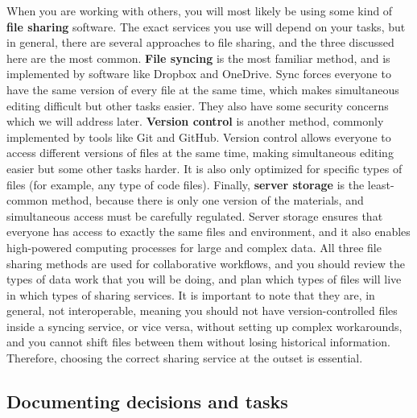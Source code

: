 When you are working with others, you will most likely be using
some kind of \textbf{file sharing} software.
The exact services you use will depend on your tasks,
but in general, there are several approaches to file sharing,
and the three discussed here are the most common.
\textbf{File syncing} is the most familiar method,
and is implemented by software like Dropbox and OneDrive.
Sync forces everyone to have the same version of every file at the same time,
which makes simultaneous editing difficult but other tasks easier.
They also have some security concerns which we will address later.
\textbf{Version control} is another method,
commonly implemented by tools like Git and GitHub.
Version control allows everyone to access different versions of files at the same time,
making simultaneous editing easier but some other tasks harder.
It is also only optimized for specific types of files 
(for example, any type of code files).
Finally, \textbf{server storage} is the least-common method,
because there is only one version of the materials,
and simultaneous access must be carefully regulated.
Server storage ensures that everyone has access
to exactly the same files and environment, and it also enables
high-powered computing processes for large and complex data.
All three file sharing methods are used for collaborative workflows,
and you should review the types of data work
that you will be doing, and plan which types of files
will live in which types of sharing services.
It is important to note that they are, in general, not interoperable,
meaning you should not have version-controlled files inside a syncing service,
or vice versa, without setting up complex workarounds,
and you cannot shift files between them without losing historical information.
Therefore, choosing the correct sharing service at the outset is essential.

\subsection{Documenting decisions and tasks}

